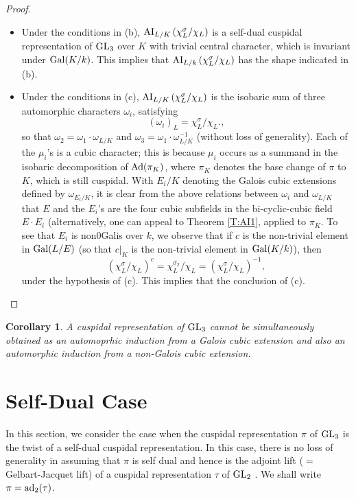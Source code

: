 \documentclass[11pt]{amsart}
\theoremstyle{plain}
\newtheorem{cor}[equation]{Corollary}
\numberwithin{equation}{section}
\def\GL{{\rm GL}}
\begin{document}
\begin{proof}
\begin{itemize}
\item[(b)] Under the conditions in (b), ${\rm AI}_{L/K} \left( \chi_L^{\sigma}/ \chi_L \right)$ is a self-dual cuspidal representation of $\GL_3$ over $K$ with trivial central character, which  is invariant under ${\rm Gal}(K/k)$.  
This implies that $ {\rm AI}_{L/k}\left( \chi_L^{\sigma}/ \chi_L \right)$ has the shape indicated in (b).
\vskip 5pt

\item[(c)] Under the conditions in (c), ${\rm AI}_{L/K} \left( \chi_L^{\sigma}/ \chi_L \right)$  is the isobaric sum of three automorphic characters $\omega_i$, satisfying
\[  (\omega_i)_L = \chi_L^{\sigma} / \chi_L., \]
so that $\omega_2 = \omega_1 \cdot \omega_{L/K}$ and $\omega_3 = \omega_1 \cdot \omega_{L/K}^{-1}$ (without loss of generality).
Each of the $\mu_i$'s is a cubic character; this is because $\mu_i$ occurs as a summand in the isobaric decomposition of ${\rm Ad}(\pi_K)$, where $\pi_K$ denotes the base change of $\pi$ to $K$, which is still cuspidal.
With $E_i/K$ denoting the Galois cubic extensions defined by $\omega_{E_i/K}$, it is clear from the above relations between $\omega_i$ and $\omega_{L/K}$ that $E$ and the $E_i$'s are the four cubic subfields in the bi-cyclic-cubic field $E \cdot E_i$ (alternatively, one can appeal to Theorem \ref{T:AI1}, applied to $\pi_K$. To see that $E_i$ is non0Galis over $k$, we observe that if $c$ is the non-trivial element in ${\rm Gal}(L/E)$ (so that $c|_K$ is the non-trivial element in ${\rm Gal}(K/k)$),   then
\[  (\chi_L^{\sigma} / \chi_L )^c = \chi_L^{\sigma_2} / \chi_L =  (\chi_L^{\sigma} / \chi_L )^{-1}, \]
under the hypothesis of (c).  This implies that the conclusion of (c). 
  \end{itemize}
\end{proof}
\vskip 5pt


\begin{cor}
A cuspidal representation of $\GL_3$ cannot be simultaneously obtained as 
 an  automoprhic induction from a Galois cubic extension and also an automorphic induction from a non-Galois cubic extension.

\end{cor}
\vskip 5pt


 
\vskip 10pt




\section{\bf Self-Dual Case}
In this section, we consider the case when the cuspidal representation $\pi$ of $\GL_3$ is  the twist of a self-dual cuspidal representation.
In this case, there is no loss of generality in assuming that $\pi$ is self dual  and hence is the adjoint lift ($=$ Gelbart-Jacquet lift) of a cuspidal representation $\tau$ of $\GL_2$ \cite{GJ}. 
We shall write $\pi ={\rm ad}_2(\tau)$.
\end{document}
